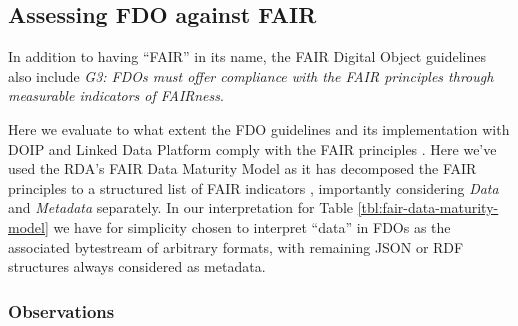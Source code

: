 \documentclass[fleqn,10pt,lineno]{wlpeerjlua}
\begin{document}



\subsection*{Assessing FDO against FAIR}\label{sec:fair-compare}

In addition to having ``FAIR'' in its name, the FAIR Digital Object guidelines \autocite{fdo-RequirementSpec} also include \emph{G3: FDOs must offer compliance with the FAIR principles through measurable indicators of FAIRness}.

Here we evaluate to what extent the FDO guidelines and its implementation with DOIP and Linked Data Platform \autocite{FDOFramework} comply with the FAIR principles \autocite{wilkinsonFAIRGuidingPrinciples2016e}. Here we've used the RDA's FAIR Data Maturity Model \autocite{groupFAIRDataMaturity2020} as it has decomposed the FAIR principles to a structured list of FAIR indicators \autocite{bahimFAIRDataMaturity2020a}, importantly considering \emph{Data} and \emph{Metadata} separately. In our interpretation for Table \vref{tbl:fair-data-maturity-model} we have for simplicity chosen to interpret ``data'' in FDOs as the associated bytestream of arbitrary formats, with remaining JSON or RDF structures always considered as metadata.


\subsubsection*{Observations}
\end{document}
